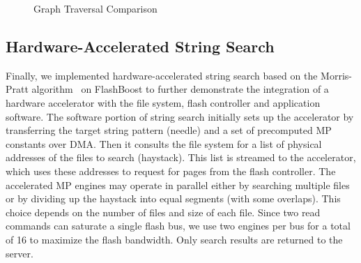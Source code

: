 
\begin{figure}[ht!]
	\centering
		\hfill
		\hfill
	\caption{Graph Traversal Comparison}
	\label{fig:graph_accel}
\end{figure}

\subsection{Hardware-Accelerated String Search}

Finally, we implemented hardware-accelerated string search based on the
Morris-Pratt algorithm~\cite{?} on FlashBoost to further demonstrate the
integration of a hardware accelerator with the file system, flash controller
and application software.  The software portion of string search initially sets
up the accelerator by transferring the target string pattern (needle) and a set
of precomputed MP constants over DMA. Then it consults the file system for a
list of physical addresses of the files to search (haystack).  This list is
streamed to the accelerator, which uses these addresses to request for pages
from the flash controller.  The accelerated MP engines may operate in parallel
either by searching multiple files or by dividing up the haystack into equal
segments (with some overlaps). This choice depends on the number of files and
size of each file. Since two read commands can saturate a single flash bus, we
use two engines per bus for a total of 16 to maximize the flash bandwidth. Only
search results are returned to the server. 
